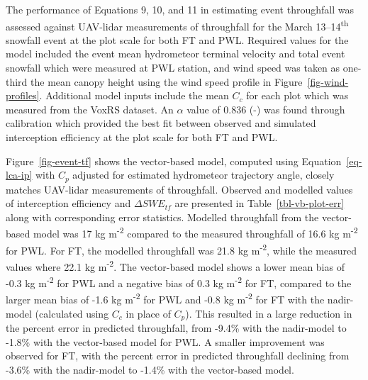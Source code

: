 \documentclass[
  letterpaper,
  DIV=11,
  numbers=noendperiod]{scrartcl}
\begin{document}
The performance of Equations 9, 10, and 11 in estimating event
throughfall was assessed against UAV-lidar measurements of throughfall
for the March 13--14\textsuperscript{th} snowfall event at the plot
scale for both FT and PWL. Required values for the model included the
event mean hydrometeor terminal velocity and total event snowfall which
were measured at PWL station, and wind speed was taken as one-third the
mean canopy height using the wind speed profile in
Figure~\ref{fig-wind-profiles}. Additional model inputs include the mean
\(C_c\) for each plot which was measured from the VoxRS dataset. An
\(\alpha\) value of 0.836 (-) was found through calibration which
provided the best fit between observed and simulated interception
efficiency at the plot scale for both FT and PWL.

Figure~\ref{fig-event-tf} shows the vector-based model, computed using
Equation~\ref{eq-lca-ip} with \(C_p\) adjusted for estimated hydrometeor
trajectory angle, closely matches UAV-lidar measurements of throughfall.
Observed and modelled values of interception efficiency and
\(\Delta SWE_{tf}\) are presented in Table~\ref{tbl-vb-plot-err} along
with corresponding error statistics. Modelled throughfall from the
vector-based model was 17 kg m\textsuperscript{-2} compared to the
measured throughfall of 16.6 kg m\textsuperscript{-2} for PWL. For FT,
the modelled throughfall was 21.8 kg m\textsuperscript{-2}, while the
measured values where 22.1 kg m\textsuperscript{-2}. The vector-based
model shows a lower mean bias of -0.3 kg m\textsuperscript{-2} for PWL
and a negative bias of 0.3 kg m\textsuperscript{-2} for FT, compared to
the larger mean bias of -1.6 kg m\textsuperscript{-2} for PWL and -0.8
kg m\textsuperscript{-2} for FT with the nadir-model (calculated using
\(C_c\) in place of \(C_p\)). This resulted in a large reduction in the
percent error in predicted throughfall, from -9.4\% with the nadir-model
to -1.8\% with the vector-based model for PWL. A smaller improvement was
observed for FT, with the percent error in predicted throughfall
declining from -3.6\% with the nadir-model to -1.4\% with the
vector-based model.
\end{document}
